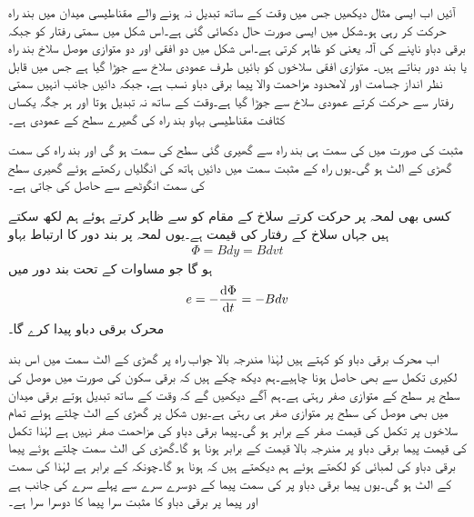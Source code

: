 آئیں اب ایسی مثال دیکھیں جس میں وقت کے ساتھ تبدیل نہ ہونے والے مقناطیسی میدان میں  بند راہ حرکت کر رہی ہو۔شکل  میں ایسی صورت حال دکھائی گئی ہے۔اس شکل میں  سمتی رفتار کو جبکہ  برقی دباو ناپنے کی آلہ یعنی  کو ظاہر کرتی ہے۔اس شکل میں دو افقی اور دو متوازی موصل سلاخ بند راہ یا بند دور بناتے ہیں۔ متوازی افقی سلاخوں کو بائیں طرف عمودی سلاخ سے جوڑا گیا ہے جس میں قابل نظر انداز جسامت اور لامحدود مزاحمت والا پیما برقی دباو نسب ہے، جبکہ دائیں جانب انہیں  سمتی رفتار سے حرکت کرتے عمودی سلاخ سے جوڑا گیا ہے۔وقت کے ساتھ نہ تبدیل ہوتا اور ہر جگہ یکساں کثافت مقناطیسی بہاو  بند راہ کی گھیرے سطح کے عمودی ہے۔

مثبت  کی صورت میں  کی سمت ہی بند راہ سے گھیری گئی سطح کی سمت ہو گی اور بند راہ کی سمت گھڑی کے الٹ ہو گی۔یوں راہ کے مثبت سمت میں دائیں ہاتھ کی انگلیاں رکھتے ہوئے گھیری سطح کی سمت انگوٹھے سے حاصل کی جاتی ہے۔ 

کسی بھی لمحہ  پر حرکت کرتے سلاخ کے مقام کو  سے ظاہر کرتے ہوئے ہم  لکھ سکتے ہیں جہاں  سلاخ کے رفتار کی قیمت ہے۔یوں لمحہ  پر بند دور کا ارتباط بہاو
\begin{align*}
\Phi=B d y =B d v t
\end{align*} 
ہو گا جو مساوات  کے تحت بند دور میں
\begin{align*}
e=-\frac{\dif \Phi}{\dif t}=-B d v
\end{align*}
محرک برقی دباو  پیدا کرے گا۔

اب محرک برقی دباو  کو کہتے ہیں لہٰذا مندرجہ بالا جواب راہ پر گھڑی کے الٹ سمت میں اس بند لکیری تکمل سے بھی حاصل ہونا چاہیے۔ہم دیکھ چکے ہیں کہ برقی سکون کی صورت میں موصل کی سطح پر سطح کے متوازی  صفر رہتی ہے۔ہم آگے دیکھیں گے کہ وقت کے ساتھ تبدیل ہوتے برقی میدان میں بھی موصل کی سطح پر متوازی  صفر ہی رہتی ہے۔یوں شکل  پر گھڑی کے الٹ چلتے ہوئے تمام سلاخوں پر تکمل کی قیمت صفر کے برابر ہو گی۔پیما برقی دباو کی مزاحمت صفر نہیں ہے لہٰذا تکمل کی قیمت پیما برقی دباو پر مندرجہ بالا قیمت کے برابر ہونا ہو گا۔گھڑی کی الٹ سمت چلتے ہوئے پیما برقی دباو کی لمبائی کو  لکھتے ہوئے ہم دیکھتے ہیں کہ  ہونا ہو گا۔چونکہ  کے برابر ہے لہٰذا  کی سمت  کے الٹ ہو گی۔یوں پیما برقی دباو پر  کی سمت پیما کے دوسرے سرے سے پہلے سرے کی جانب ہے اور پیما پر برقی دباو کا مثبت سرا پیما کا دوسرا سرا ہے۔

